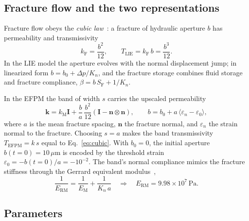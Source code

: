 \documentclass[11pt,a4paper]{tubaf-report}
\newcommand{\vect}[1]{\bm{#1}}
\newcommand{\ten}[1]{\bm{#1}}
\begin{document}
\subsection{Fracture flow and the two representations}

Fracture flow obeys the \emph{cubic law}~\cite{witherspoon1980}: a fracture
of hydraulic aperture $b$ has permeability and transmissivity
\begin{equation}
  k_{\mathrm F}=\frac{b^2}{12},
  \qquad
  T_{\mathrm{LIE}}=k_{\mathrm F}\,b=\frac{b^3}{12}.
  \label{eq:cubic}
\end{equation}
In the LIE model the aperture evolves with the normal displacement jump; in
linearized form $b=b_0+\Delta p/K_n$, and the fracture storage combines
fluid storage and fracture compliance,
$\beta=b\,S_{\mathrm F}+1/K_n$.

In the EFPM the band of width $s$ carries the upscaled permeability
\begin{equation}
  \ten k = k_{\mathrm M}\ten I
         + \frac{b}{a}\,\frac{b^2}{12}
           \left(\ten I-\vect n\otimes\vect n\right),
  \qquad
  b = b_0 + a\,\langle\varepsilon_n-\varepsilon_0\rangle ,
  \label{eq:efpm-k}
\end{equation}
where $a$ is the mean fracture spacing, $\vect n$ the fracture normal, and
$\varepsilon_n$ the strain normal to the fracture. Choosing $s=a$ makes the
band transmissivity $T_{\mathrm{EFPM}}=k\,s$ equal to
Eq.~\eqref{eq:cubic}. With $b_0=0$, the initial aperture
$b(t{=}0)=10\,\mu\mathrm m$ is encoded by the threshold strain
$\varepsilon_0=-b(t{=}0)/a=-10^{-2}$. The band's normal compliance mimics the
fracture stiffness through the Gerrard equivalent
modulus~\cite{gerrard1982},
\begin{equation}
  \frac{1}{E_{\mathrm{RM}}}
  =\frac{1}{E_{\mathrm M}}+\frac{1}{K_n\,a}
  \quad\Rightarrow\quad
  E_{\mathrm{RM}}=9.98\times10^{7}\,\mathrm{Pa}.
  \label{eq:gerrard}
\end{equation}

\subsection{Parameters}
\end{document}
